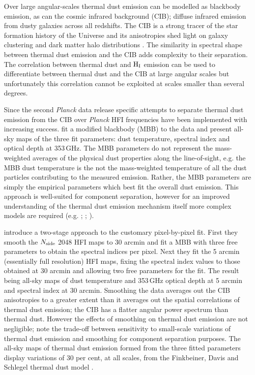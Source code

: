 \documentclass[a4paper,fleqn,usenatbib]{mnras}
\begin{document}
Over large angular-scales thermal dust emission can be modelled as blackbody emission, as can the cosmic infrared background (CIB); diffuse infrared emission from dusty galaxies across all redshifts. The CIB is a strong tracer of the star formation history of the Universe \citep{lagache} and its anisotropies shed light on galaxy clustering and dark matter halo distributions \citep{bethermin}. The similarity in spectral shape between thermal dust emission and the CIB adds complexity to their separation. The correlation between thermal dust and $\rm{H_{I}}$ emission can be used to differentiate between thermal dust and the CIB at large angular scales \citep{pr2} but unfortunately this correlation cannot be exploited at scales smaller than several degrees. 

Since the second {\it{Planck}} data release specific attempts to separate thermal dust emission from the CIB over {\it{Planck}} HFI frequencies have been implemented with increasing success. \citet{pr2} fit a modified blackbody (MBB) to the data and present all-sky maps of the three fit parameters: dust temperature, spectral index and optical depth at 353\,GHz. The MBB parameters do not represent the mass-weighted averages of the physical dust properties along the line-of-sight, e.g. the MBB dust temperature is the not the mass-weighted temperature of all the dust particles contributing to the measured emission. Rather, the MBB parameters are simply the empirical parameters which best fit the overall dust emission. This approach is well-suited for component separation, however for an improved understanding of the thermal dust emission mechanism itself more complex models are required (e.g. \citet{draine}; \citet{comp11}; \citet{jones}).

\citet{pr2} introduce a two-stage approach to the customary pixel-by-pixel fit. First they smooth the $N_{\rm{side}}$ 2048 HFI maps to 30 arcmin and fit a MBB with three free parameters to obtain the spectral indices per pixel. Next they fit the 5 arcmin (essentially full resolution) HFI maps, fixing the spectral index values to those obtained at 30 arcmin and allowing two free parameters for the fit. The result being all-sky maps of dust temperature and 353\,GHz optical depth at 5 arcmin and spectral index at 30 arcmin. Smoothing the data averages out the CIB anisotropies to a greater extent than it averages out the spatial correlations of thermal dust emission; the CIB has a flatter angular power spectrum than thermal dust. However the effects of smoothing on thermal dust emission are not negligible; \citet{pr2} note the trade-off between sensitivity to small-scale variations of thermal dust emission and smoothing for component separation purposes. The all-sky maps of thermal dust emission formed from the three fitted parameters display variations of 30 per cent, at all scales, from the Finkbeiner, Davis and Schlegel thermal dust model \citep{fds}. 
\end{document}
